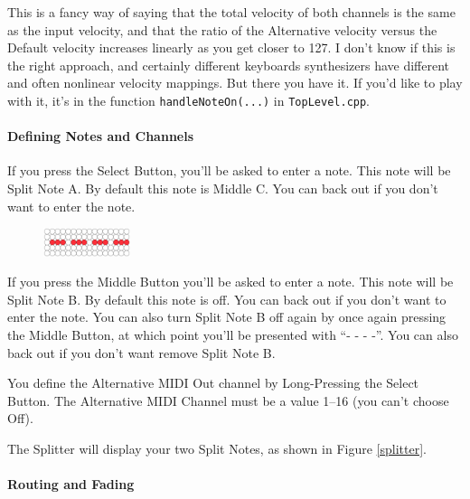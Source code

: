 \documentclass{article}
\begin{document}
This is a fancy way of saying that the total velocity of both channels is the same as the input velocity, and that the ratio of the Alternative velocity versus the Default velocity increases linearly as you get closer to 127.  I don't know if this is the right approach, and certainly different keyboards synthesizers have different and often nonlinear velocity mappings.  But there you have it.  If you'd like to play with it, it's in the function \texttt{handleNoteOn(...)} in \texttt{TopLevel.cpp}.

\paragraph{Defining Notes and Channels}

If you press the Select Button, you'll be asked to enter a note.  This note will be Split Note A.  By default this note is Middle C.  You can back out if you don't want to enter the note.

\begin{figure}
\vspace{-1em}\includegraphics[width=1in]{none}
\vspace{-2em}
\end{figure}

If you press the Middle Button you'll be asked to enter a note.  This note will be Split Note B.  By default this note is off.  You can back out if you don't want to enter the note.  You can also turn Split Note B off again by once again pressing the Middle Button, at which point you'll be presented with ``- - - -''.  You can also back out if you don't want remove Split Note B.

You define the Alternative MIDI Out channel by Long-Pressing the Select Button.  The Alternative MIDI Channel must be a value 1--16 (you can't choose Off).

The Splitter will display your two Split Notes, as shown in Figure \ref{splitter}.

\paragraph{Routing and Fading}
\end{document}
